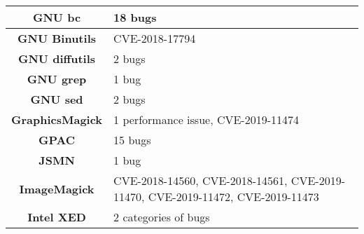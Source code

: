 \begin{table}[h]
\begin{tabular}{|c|l|}
\textbf{GNU bc}         & 18 bugs                                                                                                                                                                                            \\ \hline
\textbf{GNU Binutils}   & CVE-2018-17794                                                                                                                                                                                     \\ \hline
\textbf{GNU diffutils}  & 2 bugs                                                                                                                                                                                             \\ \hline
\textbf{GNU grep}       & 1 bug                                                                                                                                                                                              \\ \hline
\textbf{GNU sed}        & 2 bugs                                                                                                                                                                                             \\ \hline
\textbf{GraphicsMagick} & 1 performance issue, CVE-2019-11474                                                                                                                                                                     \\ \hline
\textbf{GPAC}           & 15 bugs                                                                                                                                                                                            \\ \hline
\textbf{JSMN}           & 1 bug                                                                                                                                                                                              \\ \hline
\textbf{ImageMagick}    & CVE-2018-14560, CVE-2018-14561, CVE-2019-11470, CVE-2019-11472, CVE-2019-11473                                                                                                                                                             \\ \hline
\textbf{Intel XED}      & 2 categories of bugs                                                                                                                                                                               \\ \hline

\end{tabular}
\end{table}
